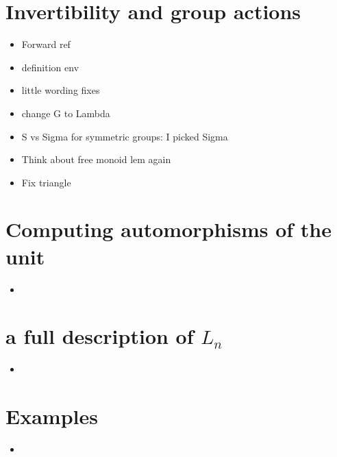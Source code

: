 \documentclass{amsart}
\begin{document}
\section{ Invertibility and group actions}
\begin{itemize}
\item Forward ref
\item definition env
\item little wording fixes
\item change G to Lambda
\item S vs Sigma for symmetric groups: I picked Sigma
\item Think about free monoid lem again
\item Fix triangle
\end{itemize}

\section{ Computing automorphisms of the unit}
\begin{itemize}
\item

\end{itemize}

\section{a full description of $L_n $}
\begin{itemize}
\item 
\end{itemize}
\section{ Examples}
\begin{itemize}
\item 
\end{itemize}
\end{document}
